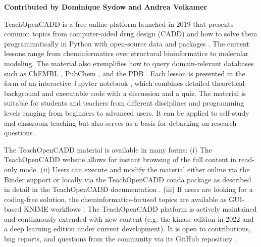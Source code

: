 \textbf{Contributed by Dominique Sydow and Andrea Volkamer}

TeachOpenCADD is a free online platform launched in 2019 that presents common topics from computer-aided drug design (CADD) and how to solve them programmatically in Python with open-source data and packages \cite{TeachOpenCADD2019, TeachOpenCADD2022, TeachOpenCADDKinaseEdition}. The current lessons range from cheminformatics over structural bioinformatics to molecular modeling. The material also exemplifies how to query domain-relevant databases such as ChEMBL \cite{Mendez_2018_ChEMBL}, PubChem \cite{Kim_2021_PubChem}, and the PDB \cite{Burley_2020_PDB}. 
Each lesson is presented in the form of an interactive Jupyter notebook \cite{Kluyver_2016_Jupyter}, which combines detailed theoretical background and executable code with a discussion and a quiz. The material is suitable for students and teachers from different disciplines and programming levels ranging from beginners to advanced users. It can be applied to self-study and classroom teaching but also serves as a basis for debarking on research questions \cite{TeachOpenCADDTeaching}. 

The TeachOpenCADD material is available in many forms: (i) The TeachOpenCADD website \cite{TOC_Website} allows for instant browsing of the full content in read-only mode. (ii) Users can execute and modify the material either online via the Binder \cite{binder} support or locally via the TeachOpenCADD conda package \cite{conda_forge_community_2015_4774216, conda_forge_toc} as described in detail in the TeachOpenCADD documentation \cite{TOC_Documentation}. (iii) If users are looking for a coding-free solution, the cheminformatics-focused topics are available as GUI-based KNIME workflows \cite{TeachOpenCADDKNIME2019}. The TeachOpenCADD platform is actively maintained and continuously extended with new content (e.g. the kinase edition in 2022 \cite{TeachOpenCADDKinaseEdition} and a deep learning edition under current development). It is open to contributions, bug reports, and questions from the community via its GitHub repository \cite{TOC_Website}.